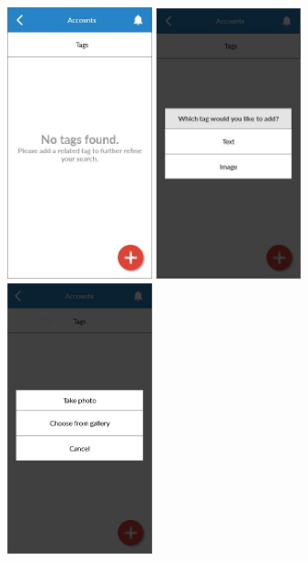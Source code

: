 \begin{figure}
  \subfigures
  \centering
  \begin{minipage}{4.6cm}
    \centering
    \includegraphics[width=4.2cm]{inc/ui_itag_step1.jpg}
    \caption{}
    \label{fig:ui_itag_step1}
  \end{minipage}
  \begin{minipage}{4.6cm}
    \centering
    \includegraphics[width=4.2cm]{inc/ui_itag_step2.jpg}
    \caption{}
    \label{fig:ui_itag_step2}
  \end{minipage}
  \begin{minipage}{4.6cm}
    \centering
    \includegraphics[width=4.2cm]{inc/ui_itag_step3.jpg}
    \caption{}
    \label{fig:ui_itag_step3}
  \end{minipage}
\end{figure}

